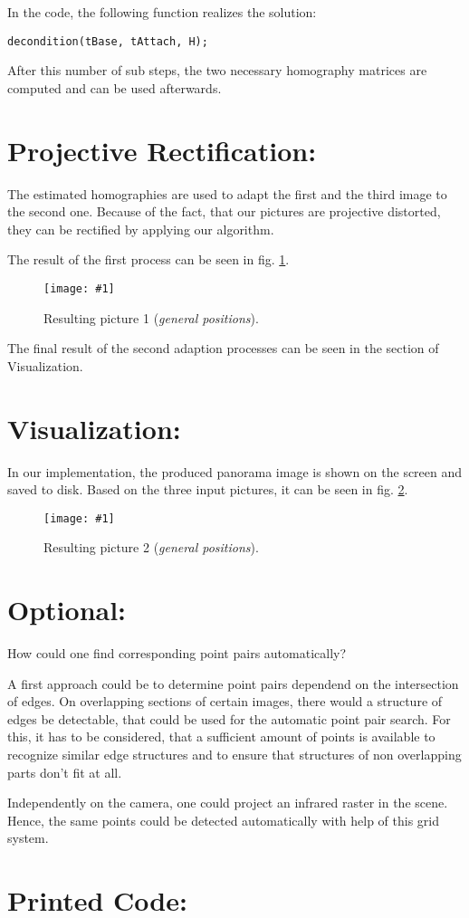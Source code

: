 \documentclass[a4paper,headings=small]{scrartcl}
\numberwithin{equation}{section} %
\numberwithin{figure}{section}   %
\newcommand{\image}[3]{
	\begin{figure}[htbp]
		\centering
		\texttt{[image: \#1]}
		\caption{#3}
		\label{fig:#1}
	\end{figure}
}
\begin{document}
In the code, the following function realizes the solution:
\begin{lstlisting}
decondition(tBase, tAttach, H);
\end{lstlisting}

After this number of sub steps, the two necessary homography matrices are computed and can be used
afterwards.

\section{Projective Rectification:}

The estimated homographies are used to adapt the first and the third image to the second one.
Because of the fact, that our pictures are projective distorted, they can be rectified by
applying our algorithm.

The result of the first process can be seen in fig. \ref{fig:../../../target/general_result_1}.

\image{../../../target/general_result_1}{0.9}{%
		Resulting picture 1 (\emph{general positions}).}


The final result of the second adaption processes can be seen in the section of Visualization.

\section{Visualization:}

In our implementation, the produced panorama image is shown on the screen and saved to disk.
Based on the three input pictures, it can be seen in fig. \ref{fig:../../../target/general_result_2}.

\image{../../../target/general_result_2}{0.9}{%
		Resulting picture 2 (\emph{general positions}).}

\section{Optional:}

How could one find corresponding point pairs automatically?

A first approach could be to determine point pairs dependend on the intersection of edges.
On overlapping sections of certain images, there would a structure of edges be detectable,
that could be used for the automatic point pair search. 
For this, it has to be considered, that a sufficient amount of points is available to
recognize similar edge structures and to ensure that structures of non overlapping parts
don't fit at all.

Independently on the camera, one could project an infrared raster in the scene.
Hence, the same points could be detected automatically with help of this grid system.

\section{Printed Code:}


\end{document}

